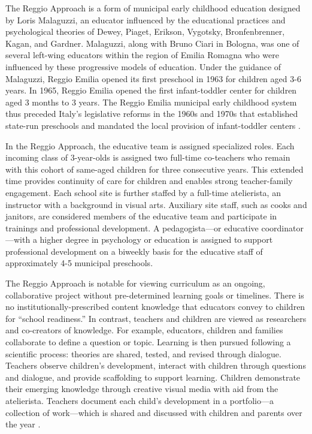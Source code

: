 The Reggio Approach is a form of municipal early childhood education designed by Loris Malaguzzi, an educator influenced by the educational practices and psychological theories of Dewey, Piaget, Erikson, Vygotsky, Bronfenbrenner, Kagan, and Gardner. Malaguzzi, along with Bruno Ciari in Bologna, was one of several left-wing educators within the region of Emilia Romagna who were influenced by these progressive models of education. Under the guidance of Malaguzzi, Reggio Emilia opened its first preschool in 1963 for children aged 3-6 years. In 1965, Reggio Emilia opened the first infant-toddler center for children aged 3 months to 3 years. The Reggio Emilia municipal early childhood system thus preceded Italy's legislative reforms in the 1960s and 1970s that established state-run preschools and mandated the local provision of infant-toddler centers \citep{Cagliari-etal-eds_2016_BOOK_Loris-Malaguzzi}. 

In the Reggio Approach, the educative team is assigned specialized roles. Each incoming class of 3-year-olds is assigned two full-time co-teachers who remain with this cohort of same-aged children for three consecutive years. This extended time provides continuity of care for children and enables strong teacher-family engagement. Each school site is further staffed by a full-time atelierista, an instructor with a background in visual arts. Auxiliary site staff, such as cooks and janitors, are considered members of the educative team and participate in trainings and professional development. A pedagogista---or educative coordinator---with a higher degree in psychology or education is assigned to support professional development on a biweekly basis for the educative staff of approximately 4-5 municipal preschools. 

The Reggio Approach is notable for viewing curriculum as an ongoing, collaborative project without pre-determined learning goals or timelines. There is no institutionally-prescribed content knowledge that educators convey to children for ``school readiness.'' In contrast, teachers and children are viewed as researchers and co-creators of knowledge. For example, educators, children and families collaborate to define a question or topic. Learning is then pursued following a scientific process: theories are shared, tested, and revised through dialogue. Teachers observe children's development, interact with children through questions and dialogue, and provide scaffolding to support learning. Children demonstrate their emerging knowledge through creative visual media with aid from the atelierista. Teachers document each child's development in a portfolio---a collection of work---which is shared and discussed with children and parents over the year \citep{Rinaldi_2006_ReggioEmilia_BOOK,Giudici-Nicolosi_2014_Reggio-Approach}. 

